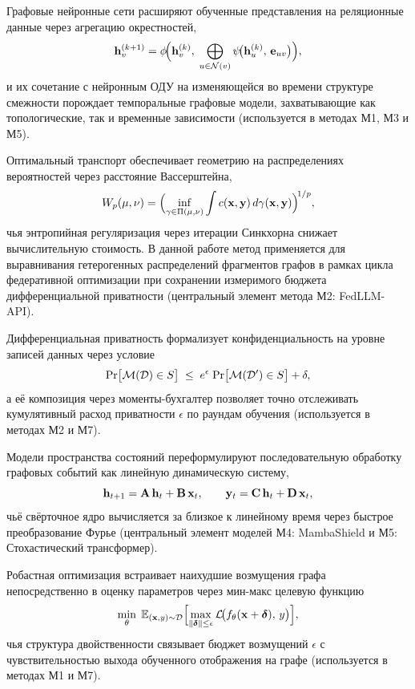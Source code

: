 Графовые нейронные сети расширяют обученные представления на реляционные данные через агрегацию окрестностей,
\begin{equation}
\mathbf{h}_v^{(k+1)}
= \phi\!\Bigl(\mathbf{h}_v^{(k)},\;
  \bigoplus_{u\in\mathcal{N}(v)}
    \psi\!\bigl(\mathbf{h}_u^{(k)},\, \mathbf{e}_{uv}\bigr)\Bigr),
\label{eq:gnn_mp}
\end{equation}
и их сочетание с нейронным ОДУ на изменяющейся во времени структуре смежности порождает темпоральные графовые модели, захватывающие как топологические, так и временные зависимости (используется в методах М1, М3 и М5).

Оптимальный транспорт обеспечивает геометрию на распределениях вероятностей через расстояние Вассерштейна,
\begin{equation}
W_p(\mu,\nu)
= \Bigl(\inf_{\gamma\in\Pi(\mu,\nu)}
    \int c(\mathbf{x},\mathbf{y})\,d\gamma(\mathbf{x},\mathbf{y})
  \Bigr)^{\!1/p},
\label{eq:wasserstein}
\end{equation}
чья энтропийная регуляризация через итерации Синкхорна снижает вычислительную стоимость. В данной работе метод применяется для выравнивания гетерогенных распределений фрагментов графов в рамках цикла федеративной оптимизации при сохранении измеримого бюджета дифференциальной приватности (центральный элемент метода М2: FedLLM-API).

Дифференциальная приватность формализует конфиденциальность на уровне записей данных через условие
\begin{equation}
\mathrm{Pr}\bigl[\mathcal{M}(\mathcal{D})\in S\bigr]
\;\le\;
e^{\epsilon}\;\mathrm{Pr}\bigl[\mathcal{M}(\mathcal{D}')\in S\bigr] + \delta,
\label{eq:dp}
\end{equation}
а её композиция через моменты-бухгалтер позволяет точно отслеживать кумулятивный расход приватности $\epsilon$ по раундам обучения (используется в методах М2 и М7).

Модели пространства состояний переформулируют последовательную обработку графовых событий как линейную динамическую систему,
\begin{equation}
\mathbf{h}_{t+1} = \mathbf{A}\,\mathbf{h}_t + \mathbf{B}\,\mathbf{x}_t, \qquad
\mathbf{y}_t = \mathbf{C}\,\mathbf{h}_t + \mathbf{D}\,\mathbf{x}_t,
\label{eq:ssm}
\end{equation}
чьё свёрточное ядро вычисляется за близкое к линейному время через быстрое преобразование Фурье (центральный элемент моделей М4: MambaShield и М5: Стохастический трансформер).

Робастная оптимизация встраивает наихудшие возмущения графа непосредственно в оценку параметров через мин-макс целевую функцию
\begin{equation}
\min_\theta\;
\mathbb{E}_{(\mathbf{x},y)\sim\mathcal{D}}
\Bigl[
  \max_{\|\boldsymbol{\delta}\|\le\epsilon}
    \mathcal{L}\!\bigl(f_\theta(\mathbf{x}+\boldsymbol{\delta}),\,y\bigr)
\Bigr],
\label{eq:robust_opt}
\end{equation}
чья структура двойственности связывает бюджет возмущений $\epsilon$ с чувствительностью выхода обученного отображения на графе (используется в методах М1 и М7).

